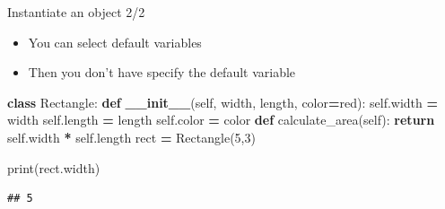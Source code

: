 \documentclass[
  8pt,
  ignorenonframetext,
]{beamer}
\newenvironment{Shaded}{\begin{snugshade}}{\end{snugshade}}
\newcommand{\BuiltInTok}[1]{#1}
\newcommand{\ControlFlowTok}[1]{\textcolor[rgb]{0.13,0.29,0.53}{\textbf{#1}}}
\newcommand{\DecValTok}[1]{\textcolor[rgb]{0.00,0.00,0.81}{#1}}
\newcommand{\FunctionTok}[1]{\textcolor[rgb]{0.13,0.29,0.53}{\textbf{#1}}}
\newcommand{\KeywordTok}[1]{\textcolor[rgb]{0.13,0.29,0.53}{\textbf{#1}}}
\newcommand{\NormalTok}[1]{#1}
\newcommand{\OperatorTok}[1]{\textcolor[rgb]{0.81,0.36,0.00}{\textbf{#1}}}
\newcommand{\StringTok}[1]{\textcolor[rgb]{0.31,0.60,0.02}{#1}}
\newcommand{\VariableTok}[1]{\textcolor[rgb]{0.00,0.00,0.00}{#1}}
\begin{document}
\begin{frame}[fragile]{Instantiate an object 2/2}
\protect\hypertarget{instantiate-an-object-22}{}
\begin{itemize}
\item
  You can select default variables
\item
  Then you don't have specify the default variable
\end{itemize}

\begin{Shaded}
\begin{Highlighting}[]
\KeywordTok{class}\NormalTok{ Rectangle:}
    \KeywordTok{def} \FunctionTok{\_\_init\_\_}\NormalTok{(}\VariableTok{self}\NormalTok{, width, length, color}\OperatorTok{=}\StringTok{\textquotesingle{}red\textquotesingle{}}\NormalTok{):}
        \VariableTok{self}\NormalTok{.width }\OperatorTok{=}\NormalTok{ width}
        \VariableTok{self}\NormalTok{.length }\OperatorTok{=}\NormalTok{ length}
        \VariableTok{self}\NormalTok{.color }\OperatorTok{=}\NormalTok{ color}
    \KeywordTok{def}\NormalTok{ calculate\_area(}\VariableTok{self}\NormalTok{):}
      \ControlFlowTok{return} \VariableTok{self}\NormalTok{.width }\OperatorTok{*} \VariableTok{self}\NormalTok{.length}
\NormalTok{rect }\OperatorTok{=}\NormalTok{ Rectangle(}\DecValTok{5}\NormalTok{,}\DecValTok{3}\NormalTok{)}

\BuiltInTok{print}\NormalTok{(rect.width)}
\end{Highlighting}
\end{Shaded}

\begin{verbatim}
## 5
\end{verbatim}
\end{frame}
\end{document}
